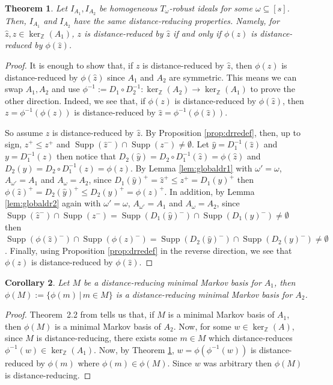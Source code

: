 \documentclass[a4paper, 12pt]{article}
\newcommand{\ZZ}{\mathbb Z}
\theoremstyle{plain}
\newtheorem{theorem}{Theorem}[section]
\newtheorem{corollary}[theorem]{Corollary}
\theoremstyle{definition}
\theoremstyle{remark}
\begin{document}
\begin{theorem}\label{thm:globaldr}
    Let $I_{A_1},I_{A_2}$ be homogeneous $T_{\omega}$-robust ideals for some $\omega \subseteq [s]$. Then, $I_{A_1}$ and $I_{A_2}$ have the same distance-reducing properties. Namely, for $\hat z,z \in \ker_\ZZ(A_1)$, $z$ is distance-reduced by $\hat z$ if and only if $\phi(z)$ is distance-reduced by $\phi(\hat z)$.
\end{theorem}

\begin{proof}
     It is enough to show that, if $z$ is distance-reduced by $\hat z$, then $\phi(z)$ is distance-reduced by $\phi(\hat z)$ since $A_1$ and $A_2$ are symmetric. This means we can swap $A_1,A_2$ and use $\phi^{-1} := D_1 \circ D_2^{-1}:\ker_\ZZ(A_2) \rightarrow \ker_\ZZ(A_1)$ to prove the other direction. Indeed, we see that, if $\phi(z)$ is distance-reduced by $\phi(\hat z)$, then $z=\phi^{-1} (\phi(z))$ is distance-reduced by $\hat z=\phi^{-1} (\phi(\hat z))$.

So assume $z$ is distance-reduced by $\hat z$. By Proposition \ref{prop:drredef}, then, up to sign, $\hat z^+ \le z^+$ and $\operatorname{Supp}(\hat z^-) \cap \operatorname{Supp}(z^-) \neq \emptyset$. Let $\hat y=D_1^{-1}(\hat z)$ and $y=D_1^{-1}(z)$ then notice that $D_2(\hat y)=D_2 \circ D_1^{-1}(\hat z)=\phi(\hat z)$ and $D_2(y)=D_2 \circ D_1^{-1}(z)=\phi(z)$. By Lemma \ref{lem:globaldr1} with $\omega'=\omega$, $A_{\omega'}=A_1$ and $A_{\omega}=A_2$, since $ D_1(\hat y)^+=\hat z^+ \le z^+=D_1(y)^+$ then $\phi(\hat z)^+=D_2(\hat y)^+ \le D_2(y)^+=\phi(z)^+$. In addition, by Lemma \ref{lem:globaldr2} again with $\omega'=\omega$, $A_{\omega'}=A_1$ and $A_{\omega}=A_2$, since $\operatorname{Supp}(\hat z^-) \cap \operatorname{Supp}(z^-)=\operatorname{Supp}(D_1(\hat y)^-) \cap \operatorname{Supp}(D_1(y)^-) \neq \emptyset$ then $\operatorname{Supp}(\phi(\hat z)^-) \cap \operatorname{Supp}(\phi(z)^-)=\operatorname{Supp}(D_2(\hat y)^-) \cap \operatorname{Supp}(D_2(y)^-) \neq \emptyset$. Finally, using Proposition \ref{prop:drredef} in the reverse direction, we see that $\phi(z)$ is distance-reduced by $\phi(\hat z)$.
\end{proof}


\begin{corollary}
    Let $M$ be a distance-reducing minimal Markov basis for $A_1$, then $\phi(M):=\{\phi(m) \,|\, m \in M\}$ is a distance-reducing minimal Markov basis for $A_2$.
\end{corollary}

\begin{proof}
    Theorem~2.2 from \cite{kosta2023strongly} tells us that, if $M$ is a minimal Markov basis of $A_1$, then $\phi(M)$ is a minimal Markov basis of $A_2$. Now, for some $w \in \ker_\ZZ(A)$, since $M$ is distance-reducing, there exists some $m \in M$ which distance-reduces $\phi^{-1}(w) \in \ker_\ZZ(A_1)$. Now, by Theorem \ref{thm:globaldr}, $w=\phi(\phi^{-1}(w))$ is distance-reduced by $\phi(m)$ where $\phi(m) \in \phi(M)$. Since $w$ was arbitrary then $\phi(M)$ is distance-reducing.
\end{proof}
\end{document}
